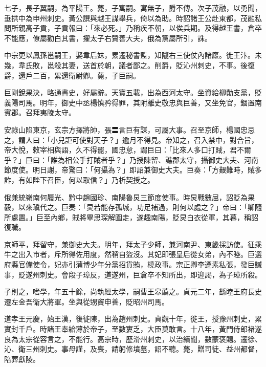 \begin{pinyinscope}
 七子，長子翼嗣，為平陽王。薨，子寓嗣。寓無子，爵不傳。次子茂融，以勇聞，垂拱中為申州刺史。黃公譔與越王謀舉兵，倚以為助。時詔諸王公赴東都，茂融私問所親高子貢，子貢報曰：「來必死。」乃稱疾不朝，以俟兵期。及得越王書，倉卒不能應，僚屬勸白其書，擢太子右贊善大夫，俄為黨屬所引，誅。



 中宗更以鳳孫邕嗣王，娶韋后妹，累遷秘書監，知隴右三使仗內諸廄。徙王汴。未幾，韋氏敗，邕殺其妻，送首於朝，議者鄙之。削爵，貶沁州刺史，不事。後復爵，還戶二百，累還衛尉卿。薨，子巨嗣。



 巨剛銳果決，略通書史，好屬辭。天寶五載，出為西河太守。坐資給柳勣支黨，貶義陽司馬。明年，御史中丞楊慎矜得罪，其附離史敬忠與巨善，又坐免官，錮置南賓郡。召拜夷陵太守。



 安祿山陷東京，玄宗方擇將帥，張〓言巨有謀，可屬大事。召至京師，楊國忠忌之，謂人曰：「小兒詎可使對天子？」逾月不得見。帝知之，召入禁中，對合旨，帝大悅，敕宰相與語，久不得罷，國忠怠，謂巨曰：「比來人多口打賊，君不爾乎？」巨曰：「誰為相公手打賊者乎？」乃授陳留、譙郡太守，攝御史大夫、河南節度使。明日謝，帝驚曰：「何攝為？」即詔兼御史大夫。巨奏：「方艱難時，賊多詐，有如陛下召臣，何以取信？」乃析契授之。



 俄兼統嶺南何履光、黔中趙國珍、南陽魯炅三節度使事。時炅戰數屈，詔貶為果毅，以來瑱代之。巨奏：「炅若能存孤城，功足補過，則何以處之？」帝曰：「卿隨所處置。」巨至內鄉，賊將畢思琛解圍走，遂趣南陽，貶炅白衣從軍，其暮，稱詔復職。



 京師平，拜留守，兼御史大夫。明年，拜太子少師，兼河南尹、東畿採訪使。征乘牛之出入市者，斥所得佐用度，然稍自盜沒。其妃即張皇后從女弟，內不睦。巨選府縣官備使令，妃亦引蒲博少年分黨招貨賄，橈政事。宗正卿李遵素私張，發巨贓事，貶遂州刺史。會段子璋反，道遂州，巨倉卒不知所出，即迎謁，為子璋所殺。



 子則之，嗜學，年五十餘，尚執經太學，嗣曹王皋薦之。貞元二年，繇睦王府長史遷左金吾衛大將軍。坐與從甥竇申善，貶昭州司馬。



 道孝王元慶，始王漢，後徙陳，出為趙州刺史。貞觀十年，徙王，授豫州刺史，累實封千戶。時諸王奉給薄於帝子，至數寠乏，大臣莫敢言。十八年，黃門侍郎褚遂良為太宗從容言之，不能行。高宗時，歷滑州刺史，以治績聞，數蒙褒賜。遷徐、沁、衛三州刺史。事母謹，及喪，請躬修墳墓，詔不聽。薨，贈司徒、益州都督，陪葬獻陵。




\end{pinyinscope}
